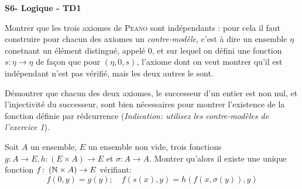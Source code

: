 \documentclass[french]{report}
\begin{document}
\begin{center}
    \huge{\textbf{S6- Logique - TD1}}
\end{center}

\begin{exo}
    Montrer que les trois axiomes de \textsc{Peano} sont indépendants : pour cela il
    faut construire pour chacun des axiomes un \textit{contre-modèle}, c'est à dire
    un ensemble \(\eta\) conetnant un élément distingué, appelé \(0\), et sur lequel
    on défini une fonction \(s:\eta\to\eta\) de façon que pour \(\left(\eta,0,s\right)\),
    l'axiome dont on veut montrer qu'il est indépendant n'est pas vérifié, mais les
    deux autres le sont.
\end{exo}

\begin{exo}
    Démontrer que chacun des deux axiomes, le successeur d'un entier est non nul, et
    l'injectivité du successeur, sont bien nécessaires pour montrer l'existence de
    la fonction définie par rédcurrence (\textit{Indication: utilisez les contre-modèles
    de l'exercice 1}).
\end{exo}

\begin{exo}
    Soit \(A\) un ensemble, \(E\) un ensemble non vide, trois fonctions \(g\colon A\to E,
    h\colon (E\times A)\to E\) et \(\sigma\colon A\to A\). Montrer qu'alors il existe
    une unique fonction \(f\colon\left(\mathbb{N}\times A\right)\to E\) vérifiant:
    \[f(0,y)=g(y);\quad f(s(x),y) = h(f(x,\sigma(y)),y)\]
\end{exo}
\end{document}
